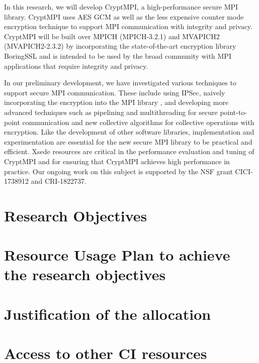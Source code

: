 In this research, we will develop CryptMPI, a high-performance secure MPI library.
CryptMPI uses AES GCM as well as the less expensive counter mode encryption technique
to support MPI communication with integrity and privacy.
CryptMPI will be built over MPICH (MPICH-3.2.1) and MVAPICH2 (MVAPICH2-2.3.2)
by incorporating the state-of-the-art encryption library BoringSSL and is intended
to be used by the broad community with MPI applications that require integrity
and privacy.

In our preliminary development, we have investigated various techniques to support
secure MPI communication. These include using IPSec, naively incorporating the
encryption into the MPI library \cite{Cluster:Naser19}, and developing more
advanced techniques such as pipelining and multithreading for secure
point-to-point communication and new collective algorithms for collective operations
with encryption. Like the development of other software libraries, implementation and
experimentation are essential for the new secure MPI library to be
practical and efficient. Xsede resources are critical in the performance
evaluation and tuning of CryptMPI and for ensuring that CryptMPI achieves high performance
in practice. Our ongoing work on this subject is supported by the NSF grant
CICI-1738912 and CRI-1822737.

\section{Research Objectives}

\section{Resource Usage Plan to achieve the research objectives}

\section{Justification of the allocation}

\section{Access to other CI resources}

